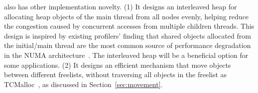 
\NM{} also has other implementation novelty. 
(1) It designs an interleaved heap for allocating heap objects of the main thread from all nodes evenly, helping reduce the congestion caused by concurrent accesses from multiple children threads. This design is inspired by existing profilers' finding that shared objects allocated from the initial/main thread are the most common source of performance degradation in the NUMA architecture~\cite{XuNuma, MemProf}. The interleaved heap will be a beneficial option for some applications. (2) It designs an efficient mechanism that move objects between different freelists, without traversing all objects in the freelist as TCMalloc~\cite{tcmalloc}, as discussed in Section~\ref{sec:movement}. 



